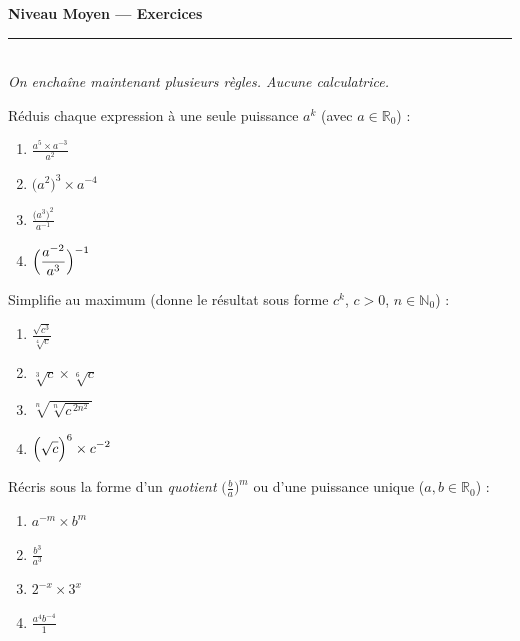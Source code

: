 \documentclass[11pt,a4paper]{article}
\newcommand{\R}{\mathbb{R}}
\newcommand{\N}{\mathbb{N}}
\newcommand{\ds}{\displaystyle}
\begin{document}
\begin{center}
{\LARGE\bfseries\color{primarydark} Niveau Moyen — Exercices}\\[2pt]
{\color{primary}\rule{0.45\textwidth}{1.2pt}}\\[3pt]
{\small\itshape On enchaîne maintenant plusieurs règles. Aucune calculatrice.}
\end{center}
\vspace{1mm}

\begin{exo}
Réduis chaque expression à une seule puissance $a^{k}$ (avec $a\in\R_0$) :
\begin{enumerate}[label=\alph*),leftmargin=2em,topsep=1pt,itemsep=1pt]
  \item $\ds\frac{a^{5}\times a^{-3}}{a^{2}}$ \qquad
  \item $\bigl(a^{2}\bigr)^{3}\times a^{-4}$ \qquad
  \item $\ds\frac{\bigl(a^{3}\bigr)^{2}}{a^{-1}}$ \qquad
  \item $\ds\Bigl(\frac{a^{-2}}{a^{3}}\Bigr)^{-1}$
\end{enumerate}
\end{exo}

\begin{exo}
Simplifie au maximum (donne le résultat sous forme $c^{k}$, $c>0$, $n\in\N_0$) :
\begin{enumerate}[label=\alph*),leftmargin=2em,topsep=1pt,itemsep=1pt]
  \item $\ds\frac{\sqrt{c^{3}}}{\sqrt[4]{c}}$ \qquad
  \item $\sqrt[3]{c}\times\sqrt[6]{c}$ \qquad
  \item $\ds\sqrt[n]{\sqrt[n]{c^{\,2n^{2}}}}$ \qquad
  \item $\ds\Bigl(\sqrt{c}\Bigr)^{6}\times c^{-2}$
\end{enumerate}
\end{exo}

\begin{exo}
Récris sous la forme d'un \emph{quotient} $\bigl(\tfrac{b}{a}\bigr)^{m}$ ou d'une puissance unique
($a,b\in\R_0$) :
\begin{enumerate}[label=\alph*),leftmargin=2em,topsep=1pt,itemsep=1pt]
  \item $a^{-m}\times b^{m}$ \qquad
  \item $\ds\frac{b^{3}}{a^{3}}$ \qquad
  \item $2^{-x}\times 3^{x}$ \qquad
  \item $\ds\frac{a^{4}b^{-4}}{1}$
\end{enumerate}
\end{exo}
\end{document}
